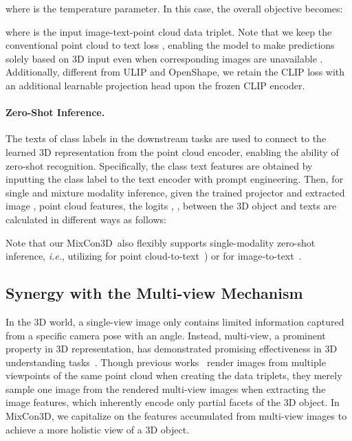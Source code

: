 \documentclass{article} \usepackage{iclr2024_conference,times}
\newcommand{\ourmethod}{MixCon3D}
\begin{document}
where  is the temperature parameter. In this case, the overall objective becomes:


where  is the input image-text-point cloud data triplet.
Note that we keep the conventional point cloud to text loss , enabling the model to make predictions solely based on 3D input even when corresponding images are unavailable \citep{scanobjectnn,modelnet40}.
Additionally, different from ULIP and OpenShape, we retain the CLIP loss  with an additional learnable projection head upon the frozen CLIP encoder.

\paragraph{Zero-Shot Inference.}
The texts of class labels in the downstream tasks are used to connect to the learned 3D representation from the point cloud encoder, enabling the ability of zero-shot recognition.
Specifically, the  class text features  are obtained by inputting the class label to the text encoder with prompt engineering.
Then, for single and mixture modality inference, given the trained projector  and extracted image , point cloud  features, the logits , ,  between the 3D object and texts are calculated in different ways as follows:


Note that our \ourmethod~also flexibly supports single-modality zero-shot inference, \textit{i.e.}, utilizing  for point cloud-to-text~\citep{ulip, ulip2, openshape}) or  for image-to-text~\citep{zhang2022pointclip, zhu2022pointclipv2}.


\subsection{Synergy with the Multi-view Mechanism}
\label{subsec:multi-view}
In the 3D world, a single-view image only contains limited information captured from a specific camera pose with an angle.
Instead, multi-view, a prominent property in 3D representation, has demonstrated promising effectiveness in 3D understanding tasks~\citep{MVConv,jaritz2019multi,hamdi2021mvtn,hamdi2023voint}.  
Though previous works~\citep{ulip,ulip2,openshape} render images from multiple viewpoints of the same point cloud when creating the data triplets, they merely sample one image from the rendered multi-view images when extracting the image features, which inherently encode only partial facets of the 3D object.
In \ourmethod, we capitalize on the features accumulated from multi-view images to achieve a more holistic view of a 3D object.
\end{document}
